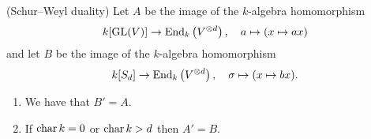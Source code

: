\begin{theorem}(Schur--Weyl duality)
  \label{theorem: schur weyl duality}
  Let $A$ be the image of the $k$-algebra homomorphism
  \[
            k[\operatorname{GL}(V)]
    \to     \operatorname{End}_k\left( V^{\otimes d} \right),
    \quad   a
    \mapsto (x \mapsto ax)
  \]
  and let $B$ be the image of the $k$-algebra homomorphism
  \[
            k[S_d]
    \to     \operatorname{End}_k\left( V^{\otimes d} \right),
    \quad   \sigma
    \mapsto (x \mapsto bx).
  \]
  \begin{enumerate}
    \item \label{enum: end gl = sd}
      We have that $B' = A$.
    \item \label{enum: end sd = gl}
      If $\operatorname{char} k = 0$ or $\operatorname{char} k > d$ then $A' = B$.
  \end{enumerate}
\end{theorem}



